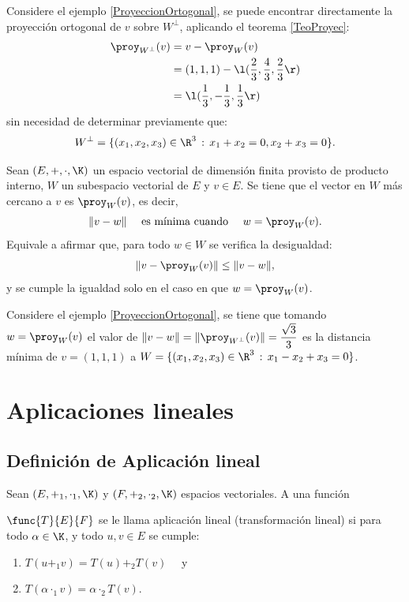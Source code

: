 \documentclass[compacto,10pt]{pubciencias-notas}
\begin{document}
\begin{ejem}\hspace{0pt} Considere el ejemplo \ref{ProyeccionOrtogonal}, se puede encontrar directamente la proyección ortogonal de $v$ sobre $W^{\perp}$, aplicando el teorema \ref{TeoProyec}:
\begin{align*}
\proy_{W^\perp}(v) 
    &=  v -\proy_{W}(v)\\
    &= (1,1,1) - \l(\dfrac{2}{3}, \dfrac{4}{3}, \dfrac{2}{3}\r)\\
    &= \l(\dfrac{1}{3}, - \dfrac{1}{3}, \dfrac{1}{3}\r)
\end{align*}
sin necesidad de determinar previamente que:
\[
W^{\perp} = \{(x_{1}, x_{2}, x_{3})\in\R^{3}\,:\,x_{1} + x_{2} = 0, x_{2} + x_{3} = 0\}.
\]
\end{ejem}
\begin{teo}
Sean $(E,+,\cdot,\K)$ un espacio vectorial de dimensión finita provisto de producto interno, $W$ un subespacio vectorial de $E$ y $v \in E$. Se tiene que el vector en $W$ más cercano a $v$ es $\proy_W(v)$, es decir,
\[
\|v-w\| \quad \text{ es mínima cuando } \quad w = \proy_W(v).
\]
Equivale a afirmar que, para todo $w\in W$ se verifica la desigualdad:
\[
    \|v - \proy_{W}(v)\| \leq \|v - w\|,
\]
y se cumple la igualdad solo en el caso en que $w = \proy_{W}(v)$.
\end{teo}

\begin{ejem}\hspace{0pt} Considere el ejemplo \ref{ProyeccionOrtogonal}, se tiene que tomando $w = \proy_{W}(v)$ el valor de $\|v - w\| = \|\proy_{W^{\perp}}(v)\| = \dfrac{\sqrt{3}}{3}$ es la distancia mínima de $v = (1,1,1)$ a $W = \{(x_{1}, x_{2}, x_{3})\in\R^{3}\,:\,x_{1} - x_{2} + x_{3} = 0\}$.
\end{ejem}

\newpage
\section{Aplicaciones lineales}

\subsection{Definición de Aplicación lineal}
\setcounter{defi}{0}
\begin{defi}
    Sean $(E,+_1,\cdot_1,\K)$ y $(F,+_2,\cdot_2,\K)$ espacios vectoriales. A una función
    
    \noindent $\func{T}{E}{F}$ se le llama aplicación lineal (transformación lineal) si para todo $\alpha \in \K$, y todo $u,v \in E$ se cumple:
    \begin{enumerate}
    \item 
        $T(u +_1 v) = T(u) +_2 T(v)\quad$ y
    \item 
        $T(\alpha \cdot_1 v ) = \alpha \cdot_2 T(v)$.
    \end{enumerate}
\end{defi}
\end{document}
